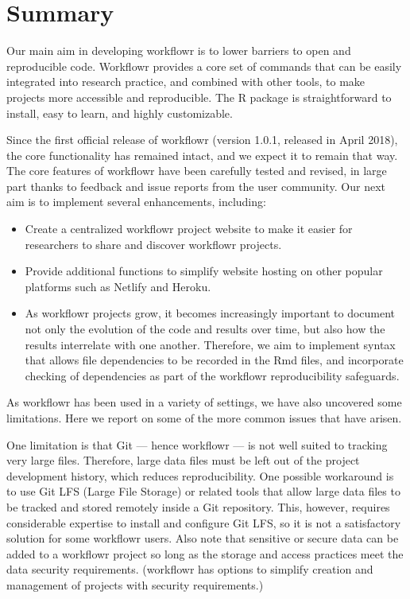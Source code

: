\documentclass[9pt,a4paper]{extarticle}
\begin{document}
\section*{Summary}

Our main aim in developing workflowr is to lower barriers to open and
reproducible code. Workflowr provides a core set of commands that can be
easily integrated into research practice, and combined with other tools,
to make projects more accessible and reproducible. The R package is
straightforward to install, easy to learn, and highly customizable.

Since the first official release of workflowr (version 1.0.1, released
in April 2018), the core functionality has remained intact, and we
expect it to remain that way. The core features of workflowr have been
carefully tested and revised, in large part thanks to feedback and issue
reports from the user community. Our next aim is to implement several
enhancements, including:

\begin{itemize}

\item Create a centralized workflowr project website to make it easier
for researchers to share and discover workflowr projects.

\item Provide additional functions to simplify website hosting on other
popular platforms such as Netlify and Heroku.

\item As workflowr projects grow, it becomes increasingly important to
document not only the evolution of the code and results over time, but
also how the results interrelate with one another. Therefore, we aim to
implement syntax that allows file dependencies to be recorded in the Rmd
files, and incorporate checking of dependencies as part of the workflowr
reproducibility safeguards.

\end{itemize}

As workflowr has been used in a variety of settings, we have also
uncovered some limitations. Here we report on some of the more common
issues that have arisen.

One limitation is that Git --- hence workflowr --- is not well suited to
tracking very large files. Therefore, large data files must be left out
of the project development history, which reduces reproducibility. One
possible workaround is to use Git LFS (Large File Storage) or related
tools that allow large data files to be tracked and stored remotely
inside a Git repository. This, however, requires considerable expertise
to install and configure Git LFS, so it is not a satisfactory solution
for some workflowr users. Also note that sensitive or secure data can be
added to a workflowr project so long as the storage and access practices
meet the data security requirements. (workflowr has options to simplify
creation and management of projects with security requirements.)
\end{document}
